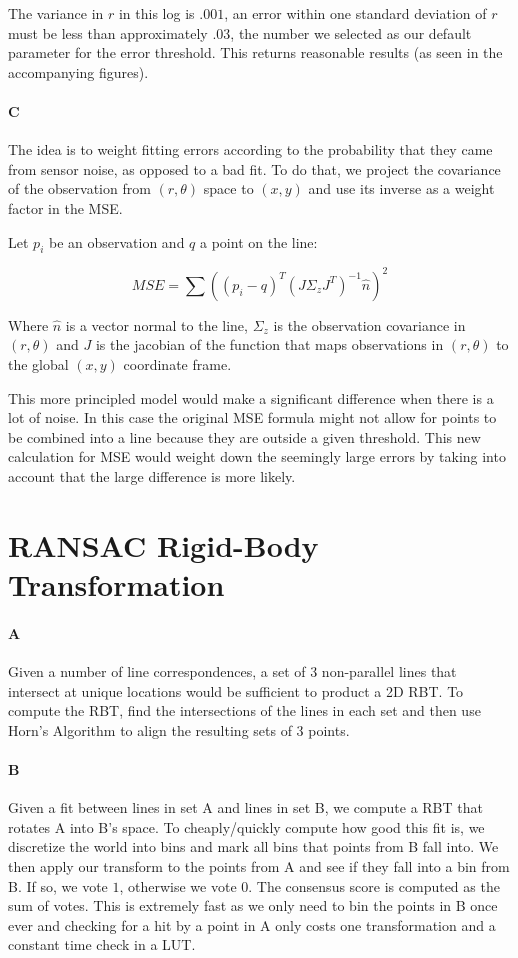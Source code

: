 \documentclass[12pt]{article}
\begin{document}
The variance in $r$ in this log is $.001$, an error within one standard deviation
of $r$ must be less than approximately $.03$, the number we selected as our
default parameter for the error threshold.  This returns reasonable results (as seen
in the accompanying figures).

\paragraph{C}
The idea is to weight fitting errors according to the probability that they came from sensor noise, as opposed to a bad fit. To do that, we project the covariance of the observation from $(r,\theta)$ space to $(x,y)$ and use its inverse as a weight factor in the MSE.

Let $p_i$ be an observation and $q$ a point on the line:

\[MSE = \sum{\left((p_i-q)^T\left(J\Sigma_zJ^T\right)^{-1}\hat{n}\right)^2} \]

Where $\hat{n}$ is a vector normal to the line, $\Sigma_z$ is the observation covariance in $(r,\theta)$ and $J$ is the jacobian of the function that maps observations in $(r,\theta)$ to the global $(x,y)$ coordinate frame.

This more principled model would make a significant difference when there is a lot of noise.  In this case the original MSE formula might not allow for points to be combined into a line because they are outside a given threshold.  This new calculation for MSE would weight down the seemingly large errors by taking into account that the large difference is more likely. 
\section{RANSAC Rigid-Body Transformation}

\paragraph{A}
Given a number of line correspondences, a set of 3 non-parallel lines that
intersect at unique locations would be sufficient to product a 2D RBT. To
compute the RBT, find the intersections of the lines in each set and then
use Horn's Algorithm to align the resulting sets of 3 points.

\paragraph{B}
Given a fit between lines in set A and lines in set B, we compute a RBT that
rotates A into B's space. To cheaply/quickly compute how good this fit is,
we discretize the world into bins and mark all bins that points from B fall
into. We then apply our transform to the points from A and see if they fall
into a bin from B. If so, we vote $1$, otherwise we vote $0$. The consensus
score is computed as the sum of votes. This is extremely fast as we only need
to bin the points in B once ever and checking for a hit by a point in A only
costs one transformation and a constant time check in a LUT.
\end{document}
